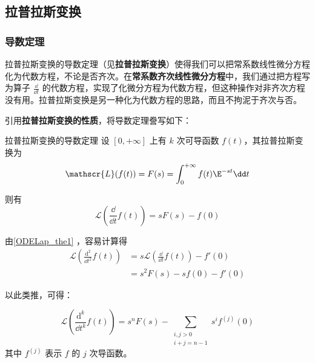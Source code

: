 

\subsection{拉普拉斯变换}

\subsubsection{导数定理}

拉普拉斯变换的导数定理（见\textbf{拉普拉斯变换}）使得我们可以把常系数线性微分方程化为代数方程，不论是否齐次。在\textbf{常系数齐次线性微分方程}中，我们通过把方程写为算子 $\frac{\dd }{\dd t}$ 的代数方程，实现了化微分方程为代数方程，但这种操作对非齐次方程没有用。拉普拉斯变换是另一种化为代数方程的思路，而且不拘泥于齐次与否。

引用\textbf{拉普拉斯变换的性质}，将导数定理誊写如下：
\begin{theorem}{拉普拉斯变换的导数定理}\label{ODELap_the1}
设 $[0, +\infty]$ 上有 $k$ 次可导函数 $f(t)$，其拉普拉斯变换为
\begin{equation}
\mathscr{L}(f(t))=F(s)=\int^{+\infty}_0f(t)\E^{-st}\dd t
\end{equation}

则有
\begin{equation}
\mathscr{L}(\frac{\dd}{\dd t}f(t))=sF(s)-f(0)
\end{equation}
\end{theorem}

由\autoref{ODELap_the1} ，容易计算得
\begin{equation}
\begin{aligned}
\mathscr{L}(\frac{\mathrm{d}^2}{\dd t^2}f(t))&=s\mathscr{L}(\frac{\dd}{\dd t}f(t))-f'(0)\\
&=s^2F(s)-sf(0)-f'(0)
\end{aligned}
\end{equation}

以此类推，可得：

\begin{corollary}{}\label{ODELap_cor1}
\begin{equation}
\mathscr{L}(\frac{\mathrm{d}^k}{\dd t^k}f(t))=s^nF(s)-\sum_{\substack{i, j>0\\   i+j=n-1}}s^if^{(j)}(0)
\end{equation}
其中 $f^{(j)}$ 表示 $f$ 的 $j$ 次导函数。



\end{corollary}




